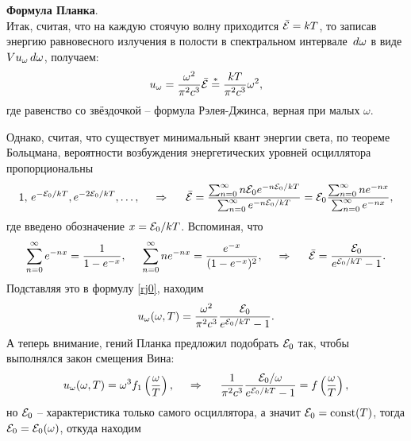 \textbf{Формула Планка}. 
\\
 Итак, считая, что на каждую стоячую волну приходится $\bar{\mathcal E} = kT$, то записав энергию равновесного излучения в полости в спектральном интервале $\, d \omega$ в виде $V u_\omega \, d \omega$, получаем:
 \begin{equation}
     u_\omega  = \frac{\omega^2}{\pi^2 c^3} \bar{\mathcal E} \overset{*}{=}  \frac{kT}{\pi^2 c^3} \omega^2,
     \label{rj0}
 \end{equation}
где равенство со звёздочкой -- формула Рэлея-Джинса, верная при малых $\omega$. 

Однако, считая, что существует минимальный квант энергии света, по теореме Больцмана, вероятности возбуждения энергетических уровней осциллятора пропорциональны
\begin{equation*}
    1,\, e^{-\mathcal E_0/kT}, e^{- 2 \mathcal E_0/kT}, \ldots,
    \hspace{0.5cm} \Rightarrow \hspace{0.5cm}
    \bar{\mathcal E} = \frac{\sum_{n=0}^{\infty}  n \mathcal E_0 e^{- n \mathcal E_0 / kT}}{\sum_{n=0}^{\infty} e^{-n \mathcal E_0 / kT}} = \mathcal E_0 \frac{\sum_{n=0}^{\infty} n e^{-n x}}{\sum_{n=0}^{\infty} e^{-nx}},
\end{equation*}
где введено обозначение $x = \mathcal E_0 / kT$. Вспоминая, что
\begin{equation*}
    \sum_{n=0}^{\infty} e^{-n x} = \frac{1}{1 - e^{-x}},
    \hspace{5 mm} 
    \sum_{n=0}^{\infty} n e^{-nx} = \frac{e^{-x}}{(1-e^{-x})^2},
    \hspace{0.5cm} \Rightarrow \hspace{0.5cm}
    \bar{\mathcal E} = \frac{\mathcal E_0}{e^{\mathcal E_0/ k T} - 1}.
\end{equation*}
Подставляя это в формулу \eqref{rj0}, находим
\begin{equation*}
    u_\omega (\omega, T) = \frac{\omega^2}{\pi^2 c^3} \frac{\mathcal E_0}{e^{\mathcal E_0/ kT}-1}.
\end{equation*}
А теперь внимание, гений Планка предложил подобрать $\mathcal E_0$ так, чтобы выполнялся закон смещения Вина:
\begin{equation*}
     u_\omega (\omega, T) = \omega^3 f_1\left(\frac{\omega}{T}\right),
     \hspace{0.5cm} \Rightarrow \hspace{0.5cm}
     \frac{1}{\pi^2 c^3} \frac{\mathcal E_0 / \omega}{e^{\mathcal E_0 / kT} - 1} = f\left(\frac{\omega}{T}\right),
\end{equation*}
но $\mathcal E_0$ -- характеристика только самого осциллятора, а значит $\mathcal E_0 = \textnormal{const} (T)$, тогда $\mathcal E_0 = \mathcal E_0(\omega)$, откуда находим
